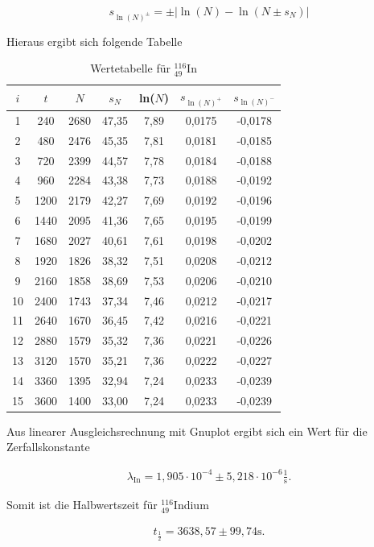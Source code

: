 \begin{equation}
 s_{\ln(N)^{\pm}} = \pm \left|\ln(N)-\ln(N\pm s_N)\right|
\end{equation}

Hieraus ergibt sich folgende Tabelle

\renewcommand{\arraystretch}{1.25}
\begin{table}[h]
 \begin{tabular}{c|c|c|c|c|c|c}
 $i$ & $t$ & $N$ & $s_N$ & ln($N$) & $s_{\ln(N)^+}$ & $s_{\ln(N)^-}$ \\
 \hline
 1&	240&	2680&	47,35&	7,89&	0,0175&	-0,0178\\
2&	480&	2476&	45,35&	7,81&	0,0181&	-0,0185\\
3&	720&	2399&	44,57&	7,78&	0,0184&	-0,0188\\
4&	960&	2284&	43,38&	7,73&	0,0188&	-0,0192\\
5&	1200&	2179&	42,27&	7,69&	0,0192&	-0,0196\\
6&	1440&	2095&	41,36&	7,65&	0,0195&	-0,0199\\
7&	1680&	2027&	40,61&	7,61&	0,0198&	-0,0202\\
8&	1920&	1826&	38,32&	7,51&	0,0208&	-0,0212\\
9&	2160&	1858&	38,69&	7,53&	0,0206&	-0,0210\\
10&	2400&	1743&	37,34&	7,46&	0,0212&	-0,0217\\
11&	2640&	1670&	36,45&	7,42&	0,0216&	-0,0221\\
12&	2880&	1579&	35,32&	7,36&	0,0221&	-0,0226\\
13&	3120&	1570&	35,21&	7,36&	0,0222&	-0,0227\\
14&	3360&	1395&	32,94&	7,24&	0,0233&	-0,0239\\
15&	3600&	1400&	33,00&	7,24&	0,0233&	-0,0239\\
\end{tabular}
\caption{Wertetabelle für $^{116}_{49}$In}
\end{table}
\renewcommand{\arraystretch}{1}

Aus linearer Ausgleichsrechnung mit Gnuplot ergibt sich ein Wert für die Zerfallskonstante 

\begin{align}
\lambda_{\text{In}} = 1,905 \cdot 10^{-4} \pm 5,218 \cdot 10^{-6} \frac{1}{\text{s}}.
\end{align}

Somit ist die Halbwertszeit für $^{116}_{49}$Indium

\begin{align}
 t_{\frac12} = 3638,57 \pm 99,74 \text{s}.
 \label{in}
\end{align}

